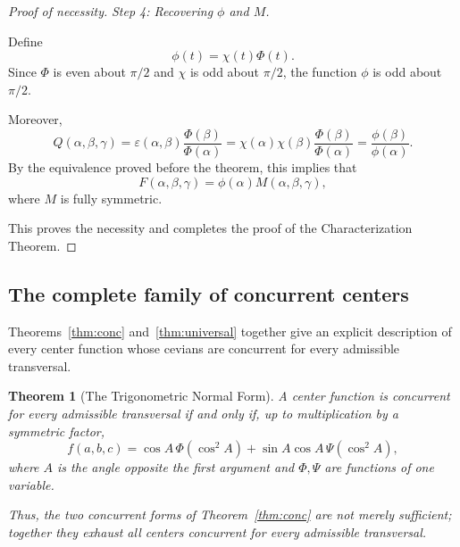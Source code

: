 \documentclass[12pt,a4paper]{amsart}
\newtheorem{theorem}{Theorem} [section]
\theoremstyle{remark}
\begin{document}
\begin{proof}[Proof of necessity]
\emph{Step 4: Recovering \(\phi\) and \(M\).}

Define
\[
\phi(t)=\chi(t)\Phi(t).
\]
Since \(\Phi\) is even about \(\pi/2\) and \(\chi\) is odd about \(\pi/2\), the
function \(\phi\) is odd about \(\pi/2\).

Moreover,
\[
Q(\alpha,\beta,\gamma)
=
\varepsilon(\alpha,\beta)\frac{\Phi(\beta)}{\Phi(\alpha)}
=
\chi(\alpha)\chi(\beta)\frac{\Phi(\beta)}{\Phi(\alpha)}
=
\frac{\phi(\beta)}{\phi(\alpha)}.
\]
By the equivalence proved before the theorem, this implies that
\[
F(\alpha,\beta,\gamma)=\phi(\alpha)M(\alpha,\beta,\gamma),
\]
where \(M\) is fully symmetric.

This proves the necessity and completes the proof of the Characterization
Theorem.
\end{proof}


\subsection{The complete family of concurrent centers}

Theorems~\ref{thm:conc} and~\ref{thm:universal} together give an explicit description of every center
function whose cevians are concurrent for every admissible transversal.

\begin{theorem}[The Trigonometric Normal Form]
\label{thm:normalForm}
A center function is concurrent for every admissible transversal if and only if,
up to multiplication by a symmetric factor,
\[
f(a,b,c)
=
\cos A\,\Phi(\cos^2A)
+
\sin A\cos A\,\Psi(\cos^2A),
\]
where $A$ is the angle opposite the first argument and $\Phi,\Psi$ are functions of one variable.

Thus, the two concurrent forms of Theorem~\ref{thm:conc} are not merely sufficient; together
they exhaust all centers concurrent for every admissible transversal.
\end{theorem}
\end{document}
